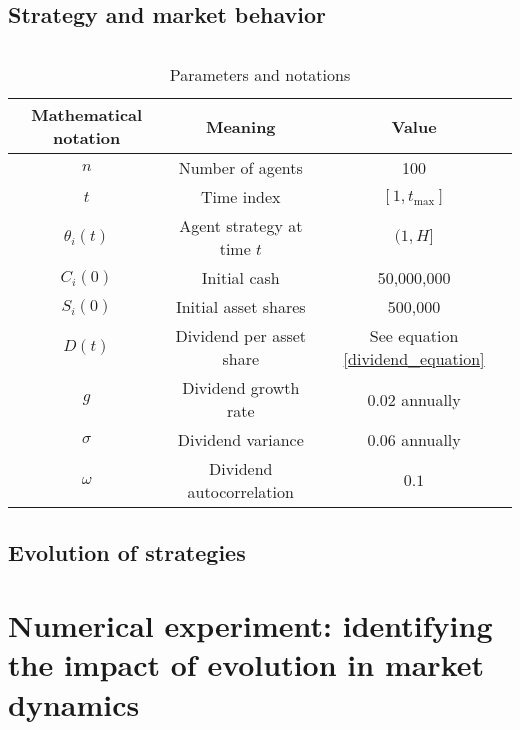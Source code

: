 \documentclass{article}
\begin{document}
\subsection{Strategy and market behavior}

\begin{equation}
    \label{trend_following_equation}
    
\end{equation}

\begin{table}[]
    \centering
    \begin{tabular}{c|c|c}
    Mathematical notation & Meaning & Value \\
    \hline
        $n$ & Number of agents & 100 \\
        $t$ & Time index & $[1,t_{\text{max}}]$\\
        $\theta_i(t)$ & Agent strategy at time $t$ & $(1, H]$\\
        $C_i(0)$ & Initial cash & 50,000,000 \\
        $S_i(0)$ & Initial asset shares & 500,000 \\
        $D(t)$ & Dividend per asset share & See equation \ref{dividend_equation} \\
        $g$ & Dividend growth rate & $0.02$ annually \\
        $\sigma$ & Dividend variance & $0.06$ annually \\
        $\omega$ & Dividend autocorrelation & $0.1$ \\
    \end{tabular}
    \caption{Parameters and notations}
    \label{parameters_correspondence}
\end{table}

\subsection{Evolution of strategies}

\section{Numerical experiment: identifying the impact of evolution in market dynamics}
\end{document}
